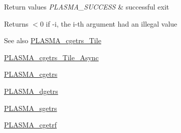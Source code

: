 \begin{DoxyRetVals}{Return values}
{\em P\+L\+A\+S\+M\+A\+\_\+\+S\+U\+C\+C\+E\+S\+S} & successful exit \\
\hline
\end{DoxyRetVals}
\begin{DoxyReturn}{Returns}
$<$0 if -\/i, the i-\/th argument had an illegal value
\end{DoxyReturn}
\begin{DoxySeeAlso}{See also}
\hyperlink{group__PLASMA__Complex32__t__Tile_ga350ad5c6377f3048eaf3c6985e2783eb_ga350ad5c6377f3048eaf3c6985e2783eb}{P\+L\+A\+S\+M\+A\+\_\+cgetrs\+\_\+\+Tile} 

\hyperlink{group__PLASMA__Complex32__t__Tile__Async_gaaac38ebd4bb530071f91f9ecaecbb3d5_gaaac38ebd4bb530071f91f9ecaecbb3d5}{P\+L\+A\+S\+M\+A\+\_\+cgetrs\+\_\+\+Tile\+\_\+\+Async} 

\hyperlink{group__PLASMA__Complex32__t_ga898ea98a3d182865980c7393dfca2c27_ga898ea98a3d182865980c7393dfca2c27}{P\+L\+A\+S\+M\+A\+\_\+cgetrs} 

\hyperlink{group__double_gaff3c22db4affbede58e22311320a2b85_gaff3c22db4affbede58e22311320a2b85}{P\+L\+A\+S\+M\+A\+\_\+dgetrs} 

\hyperlink{group__float_ga655cb742ac1c78e5ce86070f4ce1271b_ga655cb742ac1c78e5ce86070f4ce1271b}{P\+L\+A\+S\+M\+A\+\_\+sgetrs} 

\hyperlink{group__PLASMA__Complex32__t_ga9a372dbe56f1ef00531a284e1bf3a694_ga9a372dbe56f1ef00531a284e1bf3a694}{P\+L\+A\+S\+M\+A\+\_\+cgetrf} 
\end{DoxySeeAlso}
\hypertarget{group__PLASMA__Complex32__t_ga0f056cec00c55830b06c4439d4892165_ga0f056cec00c55830b06c4439d4892165}{}
